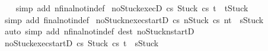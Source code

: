 \begin{isabellebody}
%
\isadelimproof
\ \ %
\endisadelimproof
%
\isatagproof
{}\isamarkupfalse%
\ {\isacharparenleft}simp\ add{\isacharcolon}\ nfinal{\isacharunderscore}notin{\isacharunderscore}def{\isacharparenright}%
\endisatagproof
{\isafoldproof}%
%
\isadelimproof
\isanewline
%
\endisadelimproof
\isanewline
{}\isamarkupfalse%
\ noStuck{\isacharunderscore}execD{\isacharcolon}\ {\isachardoublequoteopen}{\isasymlbrakk}{\isasymGamma}{\isasymturnstile}{\isasymlangle}c{\isacharcomma}s{\isasymrangle}\ {\isasymRightarrow}{\isasymnotin}{\isacharbraceleft}Stuck{\isacharbraceright}{\isacharsemicolon}\ {\isasymGamma}{\isasymturnstile}{\isasymlangle}c{\isacharcomma}s{\isasymrangle}\ {\isasymRightarrow}t{\isasymrbrakk}\ {\isasymLongrightarrow}\ t{\isasymnoteq}Stuck{\isachardoublequoteclose}\isanewline
%
\isadelimproof
\ \ %
\endisadelimproof
%
\isatagproof
{}\isamarkupfalse%
\ {\isacharparenleft}simp\ add{\isacharcolon}\ final{\isacharunderscore}notin{\isacharunderscore}def{\isacharparenright}%
\endisatagproof
{\isafoldproof}%
%
\isadelimproof
\isanewline
%
\endisadelimproof
\isanewline
{}\isamarkupfalse%
\ noStuckn{\isacharunderscore}exec{\isacharunderscore}startD{\isacharcolon}\ {\isachardoublequoteopen}{\isasymlbrakk}{\isasymGamma}{\isasymturnstile}{\isasymlangle}c{\isacharcomma}s{\isasymrangle}\ {\isacharequal}n{\isasymRightarrow}{\isasymnotin}{\isacharbraceleft}Stuck{\isacharbraceright}{\isacharsemicolon}\ {\isasymGamma}{\isasymturnstile}{\isasymlangle}c{\isacharcomma}s{\isasymrangle}\ {\isacharequal}n{\isasymRightarrow}t{\isasymrbrakk}\ {\isasymLongrightarrow}\ s{\isasymnoteq}Stuck{\isachardoublequoteclose}\isanewline
%
\isadelimproof
\ \ %
\endisadelimproof
%
\isatagproof
{}\isamarkupfalse%
\ {\isacharparenleft}auto\ simp\ add{\isacharcolon}\ nfinal{\isacharunderscore}notin{\isacharunderscore}def\ dest{\isacharcolon}\ noStuckn{\isacharunderscore}startD{\isacharparenright}%
\endisatagproof
{\isafoldproof}%
%
\isadelimproof
\isanewline
%
\endisadelimproof
\isanewline
{}\isamarkupfalse%
\ noStuck{\isacharunderscore}exec{\isacharunderscore}startD{\isacharcolon}\ {\isachardoublequoteopen}{\isasymlbrakk}{\isasymGamma}{\isasymturnstile}{\isasymlangle}c{\isacharcomma}s{\isasymrangle}\ {\isasymRightarrow}{\isasymnotin}{\isacharbraceleft}Stuck{\isacharbraceright}{\isacharsemicolon}\ {\isasymGamma}{\isasymturnstile}{\isasymlangle}c{\isacharcomma}s{\isasymrangle}\ {\isasymRightarrow}t{\isasymrbrakk}\ {\isasymLongrightarrow}\ s{\isasymnoteq}Stuck{\isachardoublequoteclose}\isanewline
%
\isadelimproof
\ \ %

\end{isabellebody}
